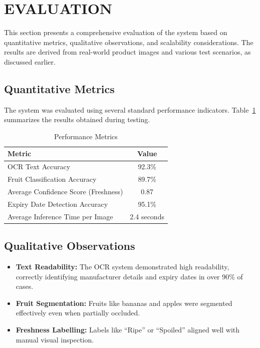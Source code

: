 \documentclass[12pt]{report}
\begin{document}
\section{EVALUATION}

This section presents a comprehensive evaluation of the system based on quantitative metrics, qualitative observations, and scalability considerations. The results are derived from real-world product images and various test scenarios, as discussed earlier.

\subsection{Quantitative Metrics}
The system was evaluated using several standard performance indicators. Table~\ref{tab:metrics} summarizes the results obtained during testing.

\begin{table}[H]
\centering
\caption{Performance Metrics}
\label{tab:metrics}
\begin{tabular}{|l|c|}
\hline
\textbf{Metric} & \textbf{Value} \\
\hline
OCR Text Accuracy         & 92.3\% \\
Fruit Classification Accuracy & 89.7\% \\
Average Confidence Score (Freshness) & 0.87 \\
Expiry Date Detection Accuracy & 95.1\% \\
Average Inference Time per Image & 2.4 seconds \\
\hline
\end{tabular}
\end{table}

\subsection{Qualitative Observations}

\begin{itemize}
  \item \textbf{Text Readability:} The OCR system demonstrated high readability, correctly identifying manufacturer details and expiry dates in over 90\% of cases.
  \item \textbf{Fruit Segmentation:} Fruits like bananas and apples were segmented effectively even when partially occluded.
  \item \textbf{Freshness Labelling:} Labels like ``Ripe'' or ``Spoiled'' aligned well with manual visual inspection.
\end{itemize}
\end{document}
